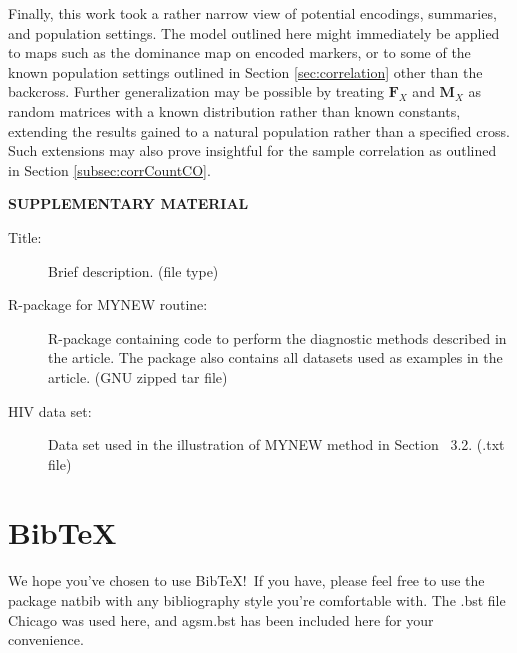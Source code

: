 \documentclass[12pt]{article}
\newcommand{\m}[1]{\mathbf{#1}}               %
\begin{document}
Finally, this work took a rather narrow view of potential encodings, summaries, and population settings. The model outlined here might immediately be applied to maps such as the dominance map on encoded markers, or to some of the known population settings outlined in Section \ref{sec:correlation} other than the backcross. Further generalization may be possible by treating $\m{F}_X$ and $\m{M}_X$ as random matrices with a known distribution rather than known constants, extending the results gained to a natural population rather than a specified cross. Such extensions may also prove insightful for the sample correlation as outlined in Section \ref{subsec:corrCountCO}.


\bigskip
\begin{center}
{\large\bf SUPPLEMENTARY MATERIAL}
\end{center}

\begin{description}

\item[Title:] Brief description. (file type)

\item[R-package for  MYNEW routine:] R-package containing code to perform the diagnostic methods described in the article. The package also contains all datasets used as examples in the article. (GNU zipped tar file)

\item[HIV data set:] Data set used in the illustration of MYNEW method in Section~ 3.2. (.txt file)

\end{description}

\section{BibTeX}

We hope you've chosen to use BibTeX!\ If you have, please feel free to use the package natbib with any bibliography style you're comfortable with. The .bst file Chicago was used here, and agsm.bst has been included here for your convenience. 



\end{document}
